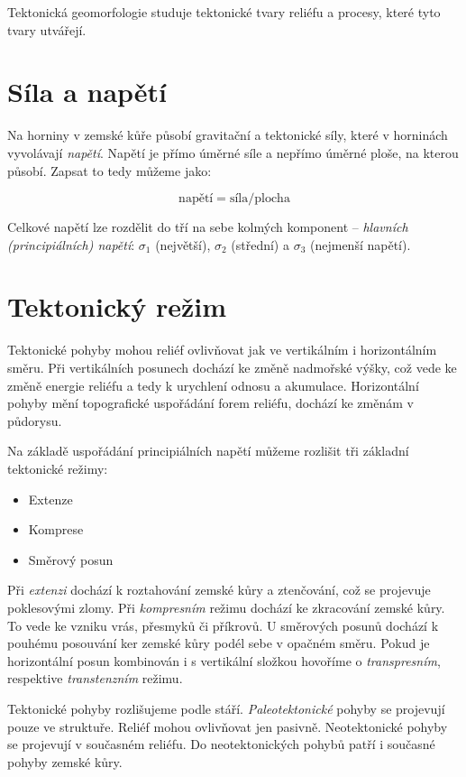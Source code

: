 Tektonická geomorfologie studuje tektonické tvary reliéfu a procesy, které tyto tvary utvářejí.

\section{Síla a napětí}
Na horniny v zemské kůře působí gravitační a tektonické síly, které v horninách vyvolávají \emph{napětí}. Napětí je přímo úměrné síle a nepřímo úměrné ploše, na kterou působí. Zapsat to tedy můžeme jako: 

\begin{equation}\label{eq:napeti}
	\text{napětí} = \text{síla}/\text{plocha}
\end{equation}

Celkové napětí lze rozdělit do tří na sebe kolmých komponent -- \emph{hlavních (principiálních) napětí}: $\sigma_{1}$ (největší), $\sigma_{2}$ (střední) a $\sigma_{3}$ (nejmenší napětí).

\section{Tektonický režim}

Tektonické pohyby mohou reliéf ovlivňovat jak ve vertikálním i horizontálním směru. Při vertikálních posunech dochází ke změně nadmořské výšky, což vede ke změně energie reliéfu a tedy k urychlení odnosu a akumulace. Horizontální pohyby mění topografické uspořádání forem reliéfu, dochází ke změnám v půdorysu. 

Na základě uspořádání principiálních napětí můžeme rozlišit tři základní tektonické režimy:
\begin{itemize}
	\item Extenze
	\item Komprese
	\item Směrový posun
\end{itemize}
Při \emph{extenzi} dochází k roztahování zemské kůry a ztenčování, což se projevuje poklesovými zlomy. Při \emph{kompresním} režimu dochází ke zkracování zemské kůry. To vede ke vzniku vrás, přesmyků či příkrovů. U směrových posunů dochází k pouhému posouvání ker zemské kůry podél sebe v opačném směru. Pokud je horizontální posun kombinován i s vertikální složkou hovoříme o \emph{transpresním}, respektive \emph{transtenzním} režimu.

Tektonické pohyby rozlišujeme podle stáří. \emph{Paleotektonické} pohyby se projevují pouze ve struktuře. Reliéf mohou ovlivňovat jen pasivně. {Neotektonické} pohyby se projevují v současném reliéfu. Do neotektonických pohybů patří i současné pohyby zemské kůry.

